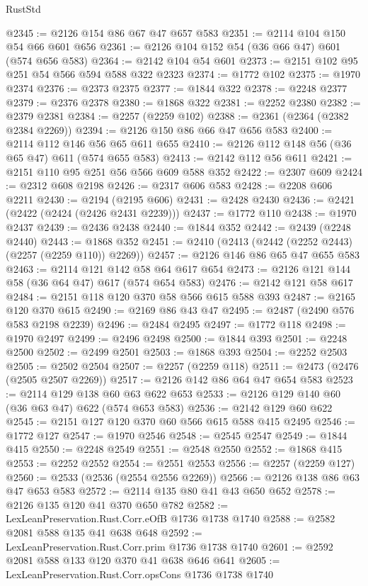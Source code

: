 \begin{lexlean}{RustStd}
\begin{coremodule}
@2345 := @2126 @154 @86 @67 @47 @657 @583
@2351 := @2114 @104 @150 @54 @66 @601 @656
@2361 := @2126 @104 @152 @54 (@36 @66 @47) @601 (@574 @656 @583)
@2364 := @2142 @104 @54 @601
@2373 := @2151 @102 @95 @251 @54 @566 @594 @588 @322 @2323
@2374 := @1772 @102
@2375 := @1970 @2374
@2376 := @2373 @2375
@2377 := @1844 @322
@2378 := @2248 @2377
@2379 := @2376 @2378
@2380 := @1868 @322
@2381 := @2252 @2380
@2382 := @2379 @2381
@2384 := @2257 (@2259 @102)
@2388 := @2361 (@2364 (@2382 @2384 @2269))
@2394 := @2126 @150 @86 @66 @47 @656 @583
@2400 := @2114 @112 @146 @56 @65 @611 @655
@2410 := @2126 @112 @148 @56 (@36 @65 @47) @611 (@574 @655 @583)
@2413 := @2142 @112 @56 @611
@2421 := @2151 @110 @95 @251 @56 @566 @609 @588 @352
@2422 := @2307 @609
@2424 := @2312 @608 @2198
@2426 := @2317 @606 @583
@2428 := @2208 @606 @2211
@2430 := @2194 (@2195 @606)
@2431 := @2428 @2430
@2436 := @2421 (@2422 (@2424 (@2426 @2431 @2239)))
@2437 := @1772 @110
@2438 := @1970 @2437
@2439 := @2436 @2438
@2440 := @1844 @352
@2442 := @2439 (@2248 @2440)
@2443 := @1868 @352
@2451 := @2410 (@2413 (@2442 (@2252 @2443) (@2257 (@2259 @110)) @2269))
@2457 := @2126 @146 @86 @65 @47 @655 @583
@2463 := @2114 @121 @142 @58 @64 @617 @654
@2473 := @2126 @121 @144 @58 (@36 @64 @47) @617 (@574 @654 @583)
@2476 := @2142 @121 @58 @617
@2484 := @2151 @118 @120 @370 @58 @566 @615 @588 @393
@2487 := @2165 @120 @370 @615
@2490 := @2169 @86 @43 @47
@2495 := @2487 (@2490 @576 @583 @2198 @2239)
@2496 := @2484 @2495
@2497 := @1772 @118
@2498 := @1970 @2497
@2499 := @2496 @2498
@2500 := @1844 @393
@2501 := @2248 @2500
@2502 := @2499 @2501
@2503 := @1868 @393
@2504 := @2252 @2503
@2505 := @2502 @2504
@2507 := @2257 (@2259 @118)
@2511 := @2473 (@2476 (@2505 @2507 @2269))
@2517 := @2126 @142 @86 @64 @47 @654 @583
@2523 := @2114 @129 @138 @60 @63 @622 @653
@2533 := @2126 @129 @140 @60 (@36 @63 @47) @622 (@574 @653 @583)
@2536 := @2142 @129 @60 @622
@2545 := @2151 @127 @120 @370 @60 @566 @615 @588 @415 @2495
@2546 := @1772 @127
@2547 := @1970 @2546
@2548 := @2545 @2547
@2549 := @1844 @415
@2550 := @2248 @2549
@2551 := @2548 @2550
@2552 := @1868 @415
@2553 := @2252 @2552
@2554 := @2551 @2553
@2556 := @2257 (@2259 @127)
@2560 := @2533 (@2536 (@2554 @2556 @2269))
@2566 := @2126 @138 @86 @63 @47 @653 @583
@2572 := @2114 @135 @80 @41 @43 @650 @652
@2578 := @2126 @135 @120 @41 @370 @650 @782
@2582 := LexLeanPreservation.Rust.Corr.eOfB @1736 @1738 @1740
@2588 := @2582 @2081 @588 @135 @41 @638 @648
@2592 := LexLeanPreservation.Rust.Corr.prim @1736 @1738 @1740
@2601 := @2592 @2081 @588 @133 @120 @370 @41 @638 @646 @641
@2605 := LexLeanPreservation.Rust.Corr.opsCons @1736 @1738 @1740

\end{coremodule}
\end{lexlean}
